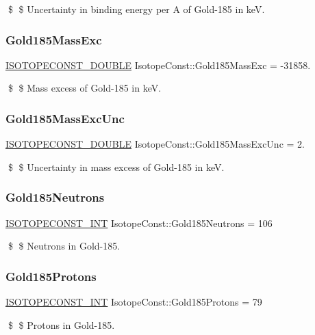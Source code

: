 \$ \$ Uncertainty in binding energy per A of Gold-\/185 in keV. \mbox{\label{group___isotope_const-_gold-_au185_ga2ef84b05354097e239cf2bcbc9927319}} 
\subsubsection{\texorpdfstring{Gold185\+Mass\+Exc}{Gold185MassExc}}
{\footnotesize\ttfamily \mbox{\hyperlink{group___isotope_const-_macros_ga8f45a7272ce02c0b4c65c44636ed719a}{I\+S\+O\+T\+O\+P\+E\+C\+O\+N\+S\+T\+\_\+\+D\+O\+U\+B\+LE}} Isotope\+Const\+::\+Gold185\+Mass\+Exc = -\/31858.}

\$ \$ Mass excess of Gold-\/185 in keV. \mbox{\label{group___isotope_const-_gold-_au185_gaf4792a1a405eb7a4fd9593276b44630d}} 
\subsubsection{\texorpdfstring{Gold185\+Mass\+Exc\+Unc}{Gold185MassExcUnc}}
{\footnotesize\ttfamily \mbox{\hyperlink{group___isotope_const-_macros_ga8f45a7272ce02c0b4c65c44636ed719a}{I\+S\+O\+T\+O\+P\+E\+C\+O\+N\+S\+T\+\_\+\+D\+O\+U\+B\+LE}} Isotope\+Const\+::\+Gold185\+Mass\+Exc\+Unc = 2.}

\$ \$ Uncertainty in mass excess of Gold-\/185 in keV. \mbox{\label{group___isotope_const-_gold-_au185_gafed4d635fe0424cded3737f93e4abbd3}} 
\subsubsection{\texorpdfstring{Gold185\+Neutrons}{Gold185Neutrons}}
{\footnotesize\ttfamily \mbox{\hyperlink{group___isotope_const-_macros_ga5f18360b3e99483a35c32d789e62621c}{I\+S\+O\+T\+O\+P\+E\+C\+O\+N\+S\+T\+\_\+\+I\+NT}} Isotope\+Const\+::\+Gold185\+Neutrons = 106}

\$ \$ Neutrons in Gold-\/185. \mbox{\label{group___isotope_const-_gold-_au185_gabf5f934afd4f33dce3c5186b532b8538}} 
\subsubsection{\texorpdfstring{Gold185\+Protons}{Gold185Protons}}
{\footnotesize\ttfamily \mbox{\hyperlink{group___isotope_const-_macros_ga5f18360b3e99483a35c32d789e62621c}{I\+S\+O\+T\+O\+P\+E\+C\+O\+N\+S\+T\+\_\+\+I\+NT}} Isotope\+Const\+::\+Gold185\+Protons = 79}

\$ \$ Protons in Gold-\/185. 